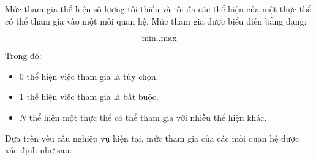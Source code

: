 Mức tham gia thể hiện số lượng tối thiểu và tối đa các thể hiện của một thực thể có thể tham gia vào một mối quan hệ. Mức tham gia được biểu diễn bằng dạng:

\[
\text{min}..\text{max}
\]

Trong đó:

\begin{itemize}

\item $0$ thể hiện việc tham gia là tùy chọn.

\item $1$ thể hiện việc tham gia là bắt buộc.

\item $N$ thể hiện một thực thể có thể tham gia với nhiều thể hiện khác.

\end{itemize}

Dựa trên yêu cầu nghiệp vụ hiện tại, mức tham gia của các mối quan hệ được xác định như sau:

